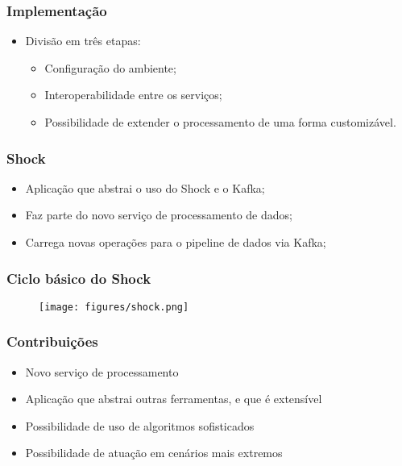 \documentclass{beamer}
\begin{document}
  \begin{frame}
      \frametitle{Implementação}
      \begin{itemize}
          \item Divisão em três etapas:
              \begin{itemize}
                  \item Configuração do ambiente;
                  \item Interoperabilidade entre os serviços;
                  \item Possibilidade de extender o processamento de uma forma customizável.
              \end{itemize}
      \end{itemize}
  \end{frame}

  \begin{frame}
      \frametitle{Shock}
      \begin{itemize}
          \item Aplicação que abstrai o uso do Shock e o Kafka;
          \item Faz parte do novo serviço de processamento de dados;
          \item Carrega novas operações para o pipeline de dados via Kafka;
      \end{itemize}
  \end{frame}

  \begin{frame}
      \frametitle{Ciclo básico do Shock}
          \begin{figure}
              \texttt{[image: figures/shock.png]}
          \end{figure}
  \end{frame}

  \begin{frame}
      \frametitle{Contribuições}
      \begin{itemize}
          \item Novo serviço de processamento
          \item Aplicação que abstrai outras ferramentas, e que é extensível
          \item Possibilidade de uso de algoritmos sofisticados
          \item Possibilidade de atuação em cenários mais extremos
      \end{itemize}
  \end{frame}
\end{document}
